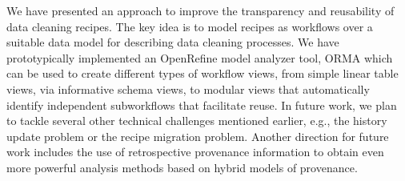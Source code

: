 \documentclass[conference]{ijdc-v14}
\newcommand{\orma}{\textsf{ORMA}\xspace}  %
\newcommand{\openrefine}{\textrm{OpenRefine}\xspace}
\begin{document}
We have presented an approach to improve the transparency and reusability of data cleaning
recipes. The key idea is to model recipes as workflows over a suitable data model for describing
data cleaning processes. We have prototypically implemented an \openrefine model analyzer tool,
\orma \cite{orma2021} which can be used to create different types of workflow views, from simple
linear table views, via informative schema views, to modular views that automatically identify
independent subworkflows that facilitate reuse. In future work, we plan to tackle several other
technical challenges mentioned earlier, e.g., the history update problem or the recipe migration
problem. Another direction for future work includes the use of retrospective provenance information
to obtain even more powerful analysis methods based on hybrid models of provenance. 





%  


%
%
% 


\end{document}
